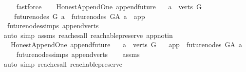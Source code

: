 \begin{isabellebody}
\ \ \isamarkupfalse%
\ fastforce%
\endisatagproof
{\isafoldproof}%
%
\isadelimproof
\ \isanewline
%
\endisadelimproof
\isanewline
{}\isamarkupfalse%
\ {\isacharparenleft}{\kern0pt}\ Honest{\isacharunderscore}{\kern0pt}Append{\isacharunderscore}{\kern0pt}One{\isacharparenright}{\kern0pt}\ append{\isacharunderscore}{\kern0pt}future{\isacharcolon}{\kern0pt}\isanewline
\ \ \ {\isachardoublequoteopen}a\ {\isasymin}\ verts\ G{\isachardoublequoteclose}\isanewline
\ \ \ {\isachardoublequoteopen}future{\isacharunderscore}{\kern0pt}nodes\ G\ a\ {\isacharequal}{\kern0pt}\ future{\isacharunderscore}{\kern0pt}nodes\ G{\isacharunderscore}{\kern0pt}A\ a\ {\isacharminus}{\kern0pt}\ {\isacharbraceleft}{\kern0pt}app{\isacharbraceright}{\kern0pt}{\isachardoublequoteclose}\isanewline
%
\isadelimproof
\ \ %
\endisadelimproof
%
\isatagproof
{}\isamarkupfalse%
\ future{\isacharunderscore}{\kern0pt}nodes{\isachardot}{\kern0pt}simps\ append{\isacharunderscore}{\kern0pt}verts\isanewline
{}\isamarkupfalse%
{\isacharparenleft}{\kern0pt}auto\ simp{\isacharcolon}{\kern0pt}\ assms\ reaches{\isacharunderscore}{\kern0pt}all\ reachable{}{\isacharunderscore}{\kern0pt}preserve\ app{\isacharunderscore}{\kern0pt}notin{\isacharparenright}{\kern0pt}\ \isamarkupfalse%
%
\endisatagproof
{\isafoldproof}%
%
\isadelimproof
\isanewline
%
\endisadelimproof
\isanewline
{}\isamarkupfalse%
\ {\isacharparenleft}{\kern0pt}\ Honest{\isacharunderscore}{\kern0pt}Append{\isacharunderscore}{\kern0pt}One{\isacharparenright}{\kern0pt}\ append{\isacharunderscore}{\kern0pt}future{}{\isacharcolon}{\kern0pt}\isanewline
\ \ \ {\isachardoublequoteopen}a\ {\isasymin}\ verts\ G{\isachardoublequoteclose}\isanewline
\ \ \ {\isachardoublequoteopen}app\ {\isasymin}\ future{\isacharunderscore}{\kern0pt}nodes\ G{\isacharunderscore}{\kern0pt}A\ a{\isachardoublequoteclose}\isanewline
%
\isadelimproof
\ \ %
\endisadelimproof
%
\isatagproof
{}\isamarkupfalse%
\ future{\isacharunderscore}{\kern0pt}nodes{\isachardot}{\kern0pt}simps\ append{\isacharunderscore}{\kern0pt}verts\isanewline
\ \ \isamarkupfalse%
\ assms\isanewline
{}\isamarkupfalse%
{\isacharparenleft}{\kern0pt}auto\ simp{\isacharcolon}{\kern0pt}\ reaches{\isacharunderscore}{\kern0pt}all\ reachable{}{\isacharunderscore}{\kern0pt}preserve{\isacharparenright}{\kern0pt}\ \isamarkupfalse%

\end{isabellebody}

